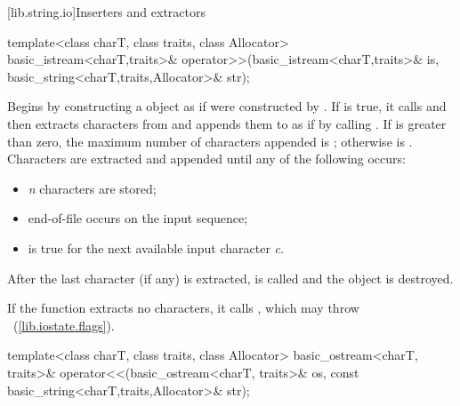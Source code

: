 \begin{itemdescr}
\pnum
\effects
{}
\end{itemdescr}

[lib.string.io]{Inserters and extractors}

%
%
\begin{itemdecl}
template<class charT, class traits, class Allocator>
  basic_istream<charT,traits>&
    operator>>(basic_istream<charT,traits>& is,
               basic_string<charT,traits,Allocator>& str);
\end{itemdecl}

\begin{itemdescr}
\pnum
\effects
Begins by constructing a
object  as if  were constructed by
.
If  is true, it calls
and then extracts characters from  and appends them
to  as if by calling
.
If
is greater than zero, the maximum
number  of characters appended is
;
otherwise  is
.
Characters are extracted and appended until any of the following
occurs:

\begin{itemize}
\item
\textit{n}
characters are stored;
\item
end-of-file occurs on the input sequence;
\item
{}
is true for the next available input character
\textit{c}.
\end{itemize}

\pnum
After the last character (if any) is extracted,
is called and the
object  is destroyed.

\pnumalt
If the function extracts no characters, it calls
,
which may throw
~(\ref{lib.iostate.flags}).

\pnum
\returns
{}
\end{itemdescr}

%
%
\begin{itemdecl}
template<class charT, class traits, class Allocator>
  basic_ostream<charT, traits>&
    operator<<(basic_ostream<charT, traits>& os,
               const basic_string<charT,traits,Allocator>& str);
\end{itemdecl}

